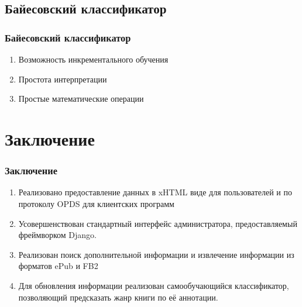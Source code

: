 \documentclass[handout]{beamer}
\begin{document}
\subsection{Байесовский классификатор}
	\begin{frame}
		\frametitle{Байесовский классификатор}
		  \begin{enumerate}
		    \item Возможность инкрементального обучения
		    \item Простота интерпретации
		    \item Простые математические операции
		  \end{enumerate}
	\end{frame}

\section{Заключение}
  \begin{frame}
    \frametitle{Заключение}
    \begin{enumerate}
      \item Реализовано предоставление данных в xHTML виде для пользователей и по протоколу OPDS для клиентских программ	  
	  \item Усовершенствован стандартный интерфейс администратора, предоставляемый фреймворком Django.
	  \item Реализован поиск дополнительной информации и извлечение информации из форматов ePub и FB2
      \item Для обновления информации реализован самообучающийся классификатор, позволяющий предсказать жанр книги по её аннотации.
	  
    \end{enumerate}
  \end{frame}
\end{document}
